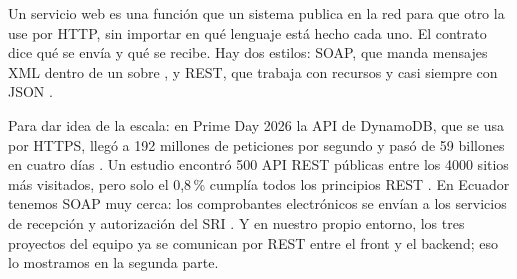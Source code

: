 Un servicio web es una función que un sistema publica en la red para que otro la use por HTTP, sin importar en qué lenguaje está hecho cada uno. El contrato dice qué se envía y qué se recibe. Hay dos estilos: SOAP, que manda mensajes XML dentro de un sobre \cite{w3c_soap12}, y REST, que trabaja con recursos y casi siempre con JSON \cite{fielding2000}.

Para dar idea de la escala: en Prime Day 2026 la API de DynamoDB, que se usa por HTTPS, llegó a 192 millones de peticiones por segundo y pasó de 59 billones en cuatro días \cite{aws_primeday2026}. Un estudio encontró 500 API REST públicas entre los 4000 sitios más visitados, pero solo el 0,8\,\% cumplía todos los principios REST \cite{neumann2021}. En Ecuador tenemos SOAP muy cerca: los comprobantes electrónicos se envían a los servicios de recepción y autorización del SRI \cite{sri_recepcion,sri_autorizacion}. Y en nuestro propio entorno, los tres proyectos del equipo ya se comunican por REST entre el front y el backend; eso lo mostramos en la segunda parte.

